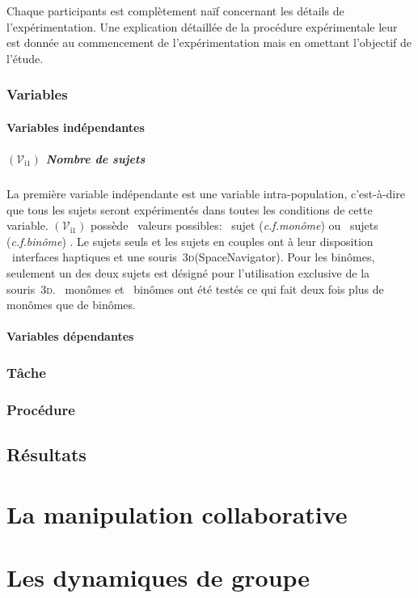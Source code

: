 \documentclass[myfrancais]{mythesis}
\newcommand{\mynum}[1]{\nombre{#1}}
\newcommand{\myvar}[2]{$\left(\mathcal{V}_{\mathrm{#1}#2}\right)$\xspace}
\newcommand{\myvari}[1]{\myvar{i}{#1}}
\newcommand{\myemph}[1]{\emph{#1}}
\newcommand{\myThreeD}{\textsc{3d}\xspace}
\newcommand{\myregistered}{\textsuperscript{\textregistered}}
\newcommand{\mySpaceNavigator}{SpaceNavigator\myregistered\xspace}
\newcommand{\mycf}{\textit{c.f.}\xspace}
\begin{document}
	Chaque participants est complètement naïf concernant les détails de l'expérimentation.
	Une explication détaillée de la procédure expérimentale leur est donnée au commencement de l'expérimentation mais en omettant l'objectif de l'étude.

	\subsection{Variables}
	\subsubsection{Variables indépendantes}
	\paragraph{\myvari{1} Nombre de sujets}
	La première variable indépendante est une variable intra-population, c'est-à-dire que tous les sujets seront expérimentés dans toutes les conditions de cette variable.
	\myvari{1} possède \mynum{2}~valeurs possibles: \og \mynum{1}~sujet (\mycf \myemph{monôme}) \fg ou \og \mynum{2}~sujets (\mycf \myemph{binôme}) \fg.
	Le sujets seuls et les sujets en couples ont à leur disposition \mynum{2}~interfaces haptiques et une souris~\myThreeD (\mySpaceNavigator).
	Pour les binômes, seulement un des deux sujets est désigné pour l'utilisation exclusive de la souris~\myThreeD.
	\mynum{24}~monômes et \mynum{12}~binômes ont été testés ce qui fait deux fois plus de monômes que de binômes.

	\subsubsection{Variables dépendantes}
	\subsection{Tâche}
	\subsection{Procédure}
	\section{Résultats}
	\chapter{La manipulation collaborative}
	\chapter{Les dynamiques de groupe}
\end{document}
